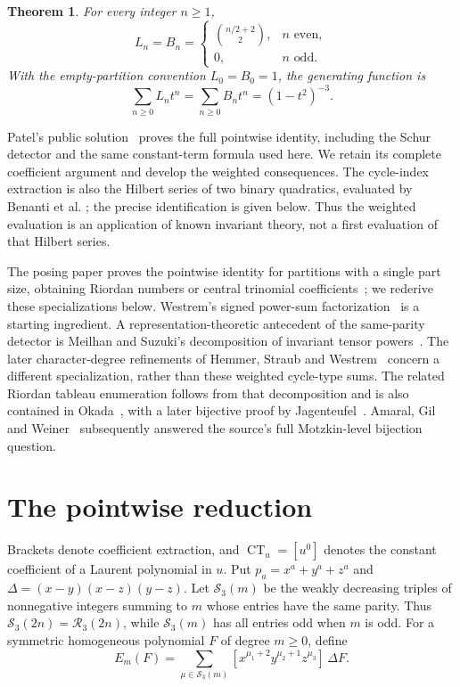 \documentclass[11pt]{article}
\newcommand{\CT}{\operatorname{CT}}
\newcommand{\R}{\mathcal R}
\newtheorem{theorem}{Theorem}
\begin{document}
\begin{theorem}\label{thm:weighted}
For every integer $n\geq1$,
\[
 L_n=B_n=
 \begin{cases}\displaystyle\binom{n/2+2}{2},&n\text{ even},\\
 0,&n\text{ odd}.
 \end{cases}
\]
With the empty-partition convention $L_0=B_0=1$, the generating function is
\begin{equation}\label{eq:answer}
 \sum_{n\geq0}L_nt^n=\sum_{n\geq0}B_nt^n=(1-t^2)^{-3}.
\end{equation}
\end{theorem}

Patel's public solution~\cite[Solution 1, Sections 1--3]{P} proves the full
pointwise identity, including the Schur detector and the same constant-term
formula used here. We retain its complete coefficient argument and develop
the weighted consequences. The cycle-index extraction is also the Hilbert
series of two binary quadratics, evaluated by Benanti et al.
\cite[Example 3.3, p.~160]{BDG}; the precise identification is given below.
Thus the weighted evaluation is an application of known invariant theory,
not a first evaluation of that Hilbert series.

The posing paper proves the pointwise identity for partitions with a
single part size, obtaining Riordan numbers or central trinomial
coefficients~\cite[Sections 4--5]{HSW}; we rederive these specializations below.
Westrem's signed power-sum factorization~\cite[Theorem 2.1]{W}
is a starting ingredient. A representation-theoretic antecedent of the
same-parity detector is Meilhan and Suzuki's decomposition of invariant
tensor powers~\cite[Lemma 3.7]{MS}. The later character-degree
refinements of Hemmer, Straub and Westrem~\cite[Theorem 1.3]{K}
concern a different specialization, rather than these weighted cycle-type sums.
The related Riordan tableau enumeration follows from that decomposition
and is also contained in Okada~\cite[Corollary 5.5(3)]{O}, with a later bijective proof by
Jagenteufel~\cite{J}. Amaral, Gil and Weiner~\cite[Theorem 4.1]{AGW}
subsequently answered the source's full Motzkin-level bijection question.

\section{The pointwise reduction}
Brackets denote coefficient extraction, and $\CT_u=[u^0]$ denotes the
constant coefficient of a Laurent polynomial in $u$.
Put $p_a=x^a+y^a+z^a$ and $\Delta=(x-y)(x-z)(y-z)$.
Let $\mathcal S_3(m)$ be the weakly decreasing triples of nonnegative
integers summing to $m$ whose entries have the same parity.
Thus $\mathcal S_3(2n)=\R_3(2n)$, while $\mathcal S_3(m)$ has all entries
odd when $m$ is odd. For a symmetric homogeneous polynomial $F$ of degree
$m\geq0$, define
\[
 E_m(F)=\sum_{\mu\in\mathcal S_3(m)}
 [x^{\mu_1+2}y^{\mu_2+1}z^{\mu_3}]\,\Delta F.
\]
\end{document}
